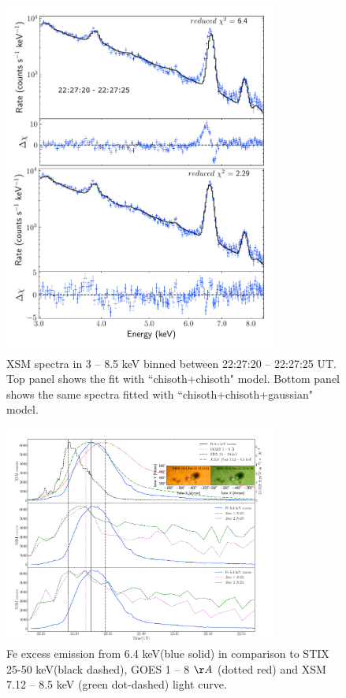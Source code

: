 \documentclass[12pt]{article}
\begin{document}
\begin{figure}
\centering
    \includegraphics[trim={0.5cm 1cm 0.5cm 0.7cm}, clip, width=0.8\textwidth]{xsm_fit.pdf}
    \caption{XSM spectra in 3 {--} 8.5 keV binned between 22:27:20 {--} 22:27:25 UT. Top panel shows the fit with ``chisoth+chisoth" model. Bottom panel shows the same spectra fitted with ``chisoth+chisoth+gaussian" model.}
    \label{fig:xsm_fit}
\end{figure}

\begin{figure}
\centering
    \includegraphics[trim={1.3cm 0.1cm 0.3cm 1.2cm}, clip, width=0.8\textwidth]{fe_excess_4.pdf}
    \caption{Fe excess emission from 6.4 keV(blue solid) in comparison to STIX 25-50 keV(black dashed), GOES 1 {--} 8 $\AA$ (dotted red) and XSM 7.12 {--} 8.5 keV (green dot-dashed) light curve.}
    \label{fig:fe_excess}
\end{figure}
\end{document}
